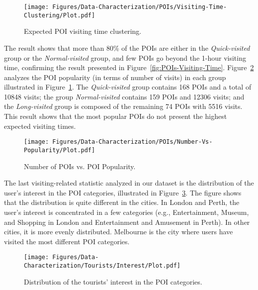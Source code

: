 \begin{figure}[!ht]
\begin{center}
 	\texttt{[image: Figures/Data-Characterization/POIs/Visiting-Time-Clustering/Plot.pdf]}
        \caption{Expected POI visiting time clustering.}
        \label{fig:POIs-Visiting-Time-Clustering}
\end{center}
\end{figure}

The result shows that more than 80\% of the POIs are either in the \textit{Quick-visited} group or the \textit{Normal-visited} group, and few POIs go beyond the 1-hour visiting time, confirming the result presented in Figure~\ref{fig:POIs-Visiting-Time}. Figure~\ref{fig:POIs-Number-Vs-Popularity} analyzes the POI popularity (in terms of number of visits) in each group illustrated in Figure~\ref{fig:POIs-Visiting-Time-Clustering}. The \textit{Quick-visited} group contains 168 POIs and a total of 10848 visits; the group \textit{Normal-visited} contains 159 POIs and 12306 visits; and the \textit{Long-visited} group is composed of the remaining 74 POIs with 5516 visits. This result shows that the most popular POIs do not present the highest expected visiting times.

\begin{figure}[!ht]
\begin{center}
 	\texttt{[image: Figures/Data-Characterization/POIs/Number-Vs-Popularity/Plot.pdf]}
        \caption{Number of POIs vs. POI Popularity.}
        \label{fig:POIs-Number-Vs-Popularity}
\end{center}
\end{figure}

The last visiting-related statistic analyzed in our dataset is the distribution of the user's interest in the POI categories, illustrated in Figure~\ref{fig:Tourists-Interest}. The figure shows that the distribution is quite different in the cities. In London and Perth, the user's interest is concentrated in a few categories (e.g., Entertainment, Museum, and Shopping in London and Entertainment and Amusement in Perth). In other cities, it is more evenly distributed. Melbourne is the city where users have visited the most different POI categories.

\begin{figure}[!ht]
\begin{center}
 	\texttt{[image: Figures/Data-Characterization/Tourists/Interest/Plot.pdf]}
 	\caption{Distribution of the tourists' interest in the POI categories.}
 	\label{fig:Tourists-Interest}
\end{center}
\end{figure}

